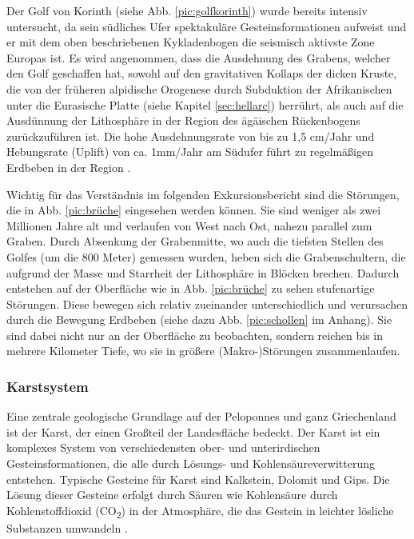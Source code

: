 \documentclass[preprint]{geomorphica} %
\begin{document}
Der Golf von Korinth (siehe Abb. \ref{pic:golfkorinth}) wurde bereits intensiv untersucht, da sein südliches Ufer spektakuläre Gesteinsformationen aufweist und er mit dem oben beschriebenen Kykladenbogen die seismisch aktivste Zone Europas ist. Es wird angenommen, dass die Ausdehnung des Grabens, welcher den Golf geschaffen hat, sowohl auf den gravitativen Kollaps der dicken Kruste, die von der früheren alpidische Orogenese durch Subduktion der Afrikanischen unter die Eurasische Platte (siehe Kapitel \ref{sec:hellarc}) herrührt, als auch auf die Ausdünnung der Lithosphäre in der Region des ägäischen Rückenbogens zurückzuführen ist. Die hohe Ausdehnungsrate von bis zu 1,5 cm/Jahr und Hebungsrate (Uplift) von ca. 1mm/Jahr am Südufer führt zu regelmäßigen Erdbeben in der Region \cite{morettiGulfCorinthActive2003}.

Wichtig für das Verständnis im folgenden Exkursionsbericht sind die Störungen, die in Abb. \ref{pic:brüche} eingesehen werden können. Sie sind weniger als zwei Millionen Jahre alt und verlaufen von West nach Ost, nahezu parallel zum Graben. Durch Absenkung der Grabenmitte, wo auch die tiefsten Stellen des Golfes (um die 800 Meter) gemessen wurden, heben sich die Grabenschultern, die aufgrund der Masse und Starrheit der Lithosphäre in Blöcken brechen. Dadurch entstehen auf der Oberfläche wie in Abb. \ref{pic:brüche} zu sehen stufenartige Störungen. Diese bewegen sich relativ zueinander unterschiedlich und verursachen durch die Bewegung Erdbeben (siehe dazu Abb. \ref{pic:schollen} im Anhang). Sie sind dabei nicht nur an der Oberfläche zu beobachten, sondern reichen bis in mehrere Kilometer Tiefe, wo sie in größere (Makro-)Störungen zusammenlaufen.

\subsubsection*{Karstsystem}
\label{sec:karst}

Eine zentrale geologische Grundlage auf der Peloponnes und ganz Griechenland ist der Karst, der einen Großteil der Landesfläche bedeckt. Der Karst ist ein komplexes System von verschiedensten ober- und unterirdischen Gesteinsformationen, die alle durch Lösungs- und Kohlensäureverwitterung entstehen. Typische Gesteine für Karst sind Kalkstein, Dolomit und Gips. Die Lösung dieser Gesteine erfolgt durch Säuren wie Kohlensäure durch Kohlenstoffdioxid (CO\textsubscript{2}) in der Atmosphäre, die das Gestein in leichter lösliche Substanzen umwandeln \cite{Zepp2017}.
\end{document}
